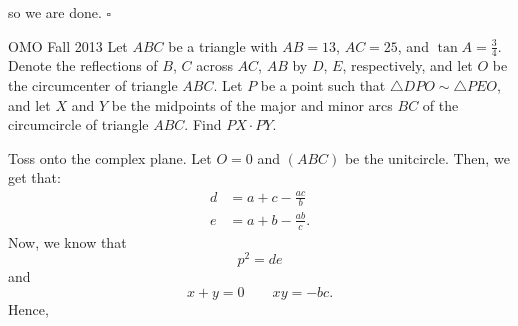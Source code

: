 \documentclass{article}
\begin{document}
so we are done. $\square$

\begin{problem}[6.38]{OMO Fall 2013}
Let $ABC$ be a triangle with $AB = 13$, $AC = 25$, and $\tan A = \tfrac{3}{4}$. Denote the reflections of $B$, $C$ across $AC$, $AB$ by $D$, $E$, respectively, and let $O$ be the circumcenter of triangle $ABC$. Let $P$ be a point such that $\triangle DPO \sim \triangle PEO$, and let $X$ and $Y$ be the midpoints of the major and minor arcs $BC$ of the circumcircle of triangle $ABC$. Find $PX \cdot PY$.
\end{problem}

Toss onto the complex plane. Let $O = 0$ and $(ABC)$ be the unitcircle. Then, we get that:
\begin{align*}
d &= a+c-\tfrac{ac}{b} \\
e &= a+b-\tfrac{ab}{c}.
\end{align*}
Now, we know that \[p^2 = de\] and \[x+y = 0 \qquad xy = -bc.\] Hence,
\end{document}
